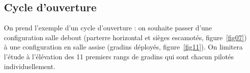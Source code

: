 \subsection{Cycle d'ouverture}

On prend l'exemple d'un cycle d'ouverture : on souhaite passer d'une configuration salle debout (parterre horizontal et sièges escamotés, figure~\ref{fig07}) à une configuration en salle assise (gradins déployés, figure~\ref{fig11}). On limitera l'étude à l'élévation des 11 premiers rangs de gradins qui sont chacun pilotés individuellement.

